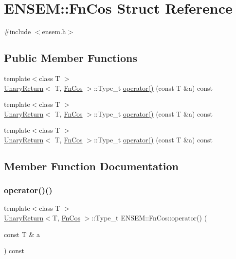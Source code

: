 \hypertarget{structENSEM_1_1FnCos}{}\section{E\+N\+S\+EM\+:\+:Fn\+Cos Struct Reference}
\label{structENSEM_1_1FnCos}


{\ttfamily \#include $<$ensem.\+h$>$}

\subsection*{Public Member Functions}
\begin{DoxyCompactItemize}
\item 
{\footnotesize template$<$class T $>$ }\\\mbox{\hyperlink{structENSEM_1_1UnaryReturn}{Unary\+Return}}$<$ T, \mbox{\hyperlink{structENSEM_1_1FnCos}{Fn\+Cos}} $>$\+::Type\+\_\+t \mbox{\hyperlink{structENSEM_1_1FnCos_a446b9cdd3e854285292e8159b45b0a58}{operator()}} (const T \&a) const
\item 
{\footnotesize template$<$class T $>$ }\\\mbox{\hyperlink{structENSEM_1_1UnaryReturn}{Unary\+Return}}$<$ T, \mbox{\hyperlink{structENSEM_1_1FnCos}{Fn\+Cos}} $>$\+::Type\+\_\+t \mbox{\hyperlink{structENSEM_1_1FnCos_a446b9cdd3e854285292e8159b45b0a58}{operator()}} (const T \&a) const
\item 
{\footnotesize template$<$class T $>$ }\\\mbox{\hyperlink{structENSEM_1_1UnaryReturn}{Unary\+Return}}$<$ T, \mbox{\hyperlink{structENSEM_1_1FnCos}{Fn\+Cos}} $>$\+::Type\+\_\+t \mbox{\hyperlink{structENSEM_1_1FnCos_a446b9cdd3e854285292e8159b45b0a58}{operator()}} (const T \&a) const
\end{DoxyCompactItemize}


\subsection{Member Function Documentation}
\mbox{\label{structENSEM_1_1FnCos_a446b9cdd3e854285292e8159b45b0a58}} 
\subsubsection{\texorpdfstring{operator()()}{operator()()}\hspace{0.1cm}{\footnotesize\ttfamily [1/3]}}
{\footnotesize\ttfamily template$<$class T $>$ \\
\mbox{\hyperlink{structENSEM_1_1UnaryReturn}{Unary\+Return}}$<$T, \mbox{\hyperlink{structENSEM_1_1FnCos}{Fn\+Cos}} $>$\+::Type\+\_\+t E\+N\+S\+E\+M\+::\+Fn\+Cos\+::operator() (\begin{DoxyParamCaption}\item[{const T \&}]{a }\end{DoxyParamCaption}) const\hspace{0.3cm}{\ttfamily [inline]}}

